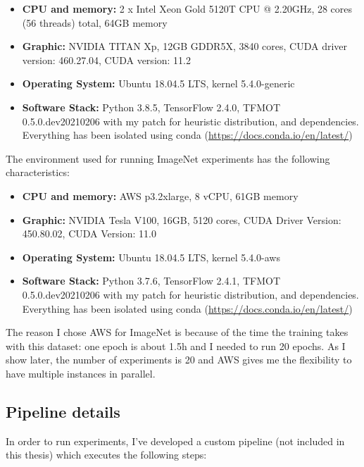 \begin{itemize}
    \item \textbf{CPU and memory:} 2 x Intel Xeon Gold 5120T CPU @ 2.20GHz, 28
        cores (56 threads) total, 64GB memory
    \item \textbf{Graphic:} NVIDIA TITAN Xp, 12GB GDDR5X, 3840 cores, CUDA
        driver version: 460.27.04, CUDA version: 11.2
    \item \textbf{Operating System:} Ubuntu 18.04.5 LTS, kernel
        5.4.0-generic
    \item \textbf{Software Stack:} Python 3.8.5, TensorFlow 2.4.0, TFMOT
        0.5.0.dev20210206 with my patch for heuristic distribution, and
        dependencies. Everything has been isolated using conda
        (\url{https://docs.conda.io/en/latest/})
\end{itemize}

The environment used for running ImageNet experiments has the following
characteristics:

\begin{itemize}
    \item \textbf{CPU and memory:} AWS p3.2xlarge, 8 vCPU, 61GB memory
    \item \textbf{Graphic:} NVIDIA Tesla V100, 16GB, 5120 cores, CUDA Driver
        Version: 450.80.02, CUDA Version: 11.0
    \item \textbf{Operating System:} Ubuntu 18.04.5 LTS, kernel
        5.4.0-aws
    \item \textbf{Software Stack:} Python 3.7.6, TensorFlow 2.4.1, TFMOT
        0.5.0.dev20210206 with my patch for heuristic distribution, and
        dependencies. Everything has been isolated using conda
        (\url{https://docs.conda.io/en/latest/})
\end{itemize}

The reason I chose AWS for ImageNet is because of the time the training takes
with this dataset: one epoch is about 1.5h and I needed to run 20 epochs.
As I show later, the number of experiments is 20 and AWS gives me the
flexibility to have multiple instances in parallel.

\subsection{Pipeline details}
In order to run experiments, I've developed a custom pipeline (not included in
this thesis) which executes the following steps:

